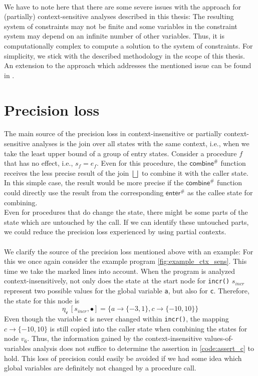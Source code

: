    \\
    We have to note here that there are some severe issues with the approach for (partially) context-sensitive analyses described in this thesis: The resulting system of constraints may not be finite and some variables in the constraint system may depend on an infinite number of other variables. Thus, it is computationally complex to compute a solution to the system of constraints. For simplicity, we stick with the described methodology in the scope of this thesis.\\
    An extension to the approach which addresses the mentioned issue can be found in \parencite{apinis2012side}.

  \section{Precision loss}\label{sec:precisionLoss}
    The main source of the precision loss in context-insensitive or partially context-sensitive analyses is the join over all states with the same context, i.e., when we take the least upper bound of a group of entry states. Consider a procedure $f$ that has no effect, i.e., $s_f = e_f$. Even for this procedure, the $\textsf{combine}^{\#}$ function receives the less precise result of the join $\bigsqcup$ to combine it with the caller state. In this simple case, the result would be more precise if the $\textsf{combine}^{\#}$ function could directly use the result from the corresponding $\textsf{enter}^{\#}$ as the callee state for combining.\\
    Even for procedures that do change the state, there might be some parts of the state which are untouched by the call. If we can identify these untouched parts, we could reduce the precision loss experienced by using partial contexts.\\
    \\
    We clarify the source of the precision loss mentioned above with an example: For this we once again consider the example program \autoref{fig:example_ctx_sens}. This time we take the marked lines into account. When the program is analyzed context-insensitively, not only does the state at the start node for \texttt{incr()} $s_{incr}$ represent two possible values for the global variable \texttt{a}, but also for \texttt{c}. Therefore, the state for this node is
    \[\eta_\textsf{v}\ [s_{incr}, \bullet] = \{a \rightarrow \{-3, 1\}, c \rightarrow \{-10, 10\}\} \]
    Even though the variable \texttt{c} is never changed within \texttt{incr()}, the mapping $c \rightarrow \{-10, 10\}$ is still copied into the caller state when combining the states for node $v_6$. Thus, the information gained by the context-insensitive values-of-variables analysis does not suffice to determine the assertion in \autoref{code:assert_c} to hold. This loss of precision could easily be avoided if we had some idea which global variables are definitely not changed by a procedure call.


